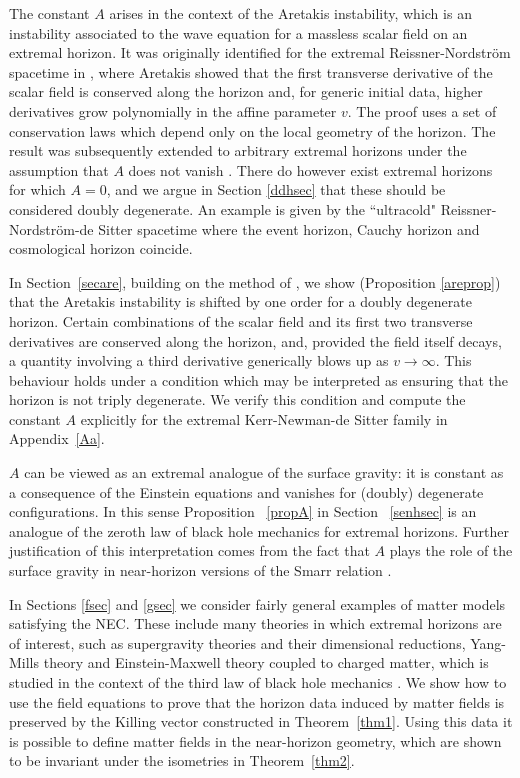 \documentclass[11pt, reqno]{amsart}
\theoremstyle{plain}
\theoremstyle{definition}
\numberwithin{equation}{section}
\begin{document}
The constant $A$ arises in the context of the Aretakis instability, which is an instability associated to the wave equation for a massless scalar field on an extremal horizon. It was originally identified for the extremal Reissner-Nordstr\"om spacetime in \cite{A11,A112}, where Aretakis showed that the first transverse derivative of the scalar field is conserved along the horizon and, for generic initial data, higher derivatives grow polynomially in the affine parameter $v$.  The proof uses a set of conservation laws which depend only on the local geometry of the horizon. The result was subsequently extended to arbitrary extremal horizons under the assumption that $A$ does not vanish \cite{LR12,A12}. There do however exist extremal horizons for which $A = 0$, and we argue in Section \ref{ddhsec} that these should be considered doubly degenerate. An example is given by the ``ultracold" Reissner-Nordstr\"om-de Sitter spacetime where the event horizon, Cauchy horizon and cosmological horizon coincide.

In Section~\ref{secare}, building on the method of \cite{LR12},  we show (Proposition \ref{areprop}) that the Aretakis instability is shifted by one order for a doubly degenerate horizon. Certain combinations of the scalar field and its first two transverse derivatives are conserved along the horizon, and, provided the field itself decays, a quantity involving a third derivative generically blows up as $v \to \infty$. This behaviour holds under a condition which may be interpreted as ensuring that the horizon is not triply degenerate. We verify this condition and compute the constant $A$ explicitly for the extremal Kerr-Newman-de Sitter family in Appendix~\ref{Aa}.

$A$ can be viewed as an extremal analogue of the surface gravity: it is constant as a consequence of the Einstein equations and vanishes for (doubly) degenerate configurations. In this sense Proposition ~\ref{propA} in Section ~\ref{senhsec} is an analogue of the zeroth law of black hole mechanics for extremal horizons. Further justification of this interpretation comes from the fact that $A$ plays the role of the surface gravity in near-horizon versions of the Smarr relation \cite{CL25}.

In Sections \ref{fsec} and \ref{gsec} we consider fairly general examples of matter models satisfying the NEC. These include many theories in which extremal horizons are of interest, such as supergravity theories and their dimensional reductions, Yang-Mills theory \cite{LL13} and Einstein-Maxwell theory coupled to charged matter, which is studied in the context of the third law of black hole mechanics \cite{KU22, R24}. We show how to use the field equations to prove that the horizon data induced by matter fields is preserved by the Killing vector constructed in Theorem~\ref{thm1}. Using this data it is possible to define matter fields in the near-horizon geometry, which are shown to be invariant under the isometries in Theorem~\ref{thm2}.
\end{document}
